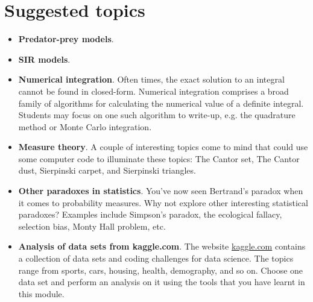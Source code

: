 \documentclass[a4paper,margins=1in]{article}
\begin{document}
\section*{Suggested topics}

\begin{itemize}
    \item \textbf{Predator-prey models}.
    \item \textbf{SIR models}.
    \item \textbf{Numerical integration}. Often times, the exact solution to an integral cannot be found in closed-form. Numerical integration comprises a broad family of algorithms for calculating the numerical value of a definite integral. Students may focus on one such algorithm to write-up, e.g. the quadrature method or Monte Carlo integration.
    \item \textbf{Measure theory}. A couple of interesting topics come to mind that could use some computer code to illuminate these topics: The Cantor set, The Cantor dust, Sierpinski carpet, and Sierpinski triangles.
    \item \textbf{Other paradoxes in statistics}. You've now seen Bertrand's paradox when it comes to probability measures. Why not explore other interesting statistical paradoxes? Examples include Simpson's paradox, the ecological fallacy, selection bias, Monty Hall problem, etc.
    \item \textbf{Analysis of data sets from kaggle.com}. The website \url{kaggle.com} contains a collection of data sets and coding challenges for data science. The topics range from sports, cars, housing, health, demography, and so on. Choose one data set and perform an analysis on it using the tools that you have learnt in this module.
\end{itemize}
\end{document}
